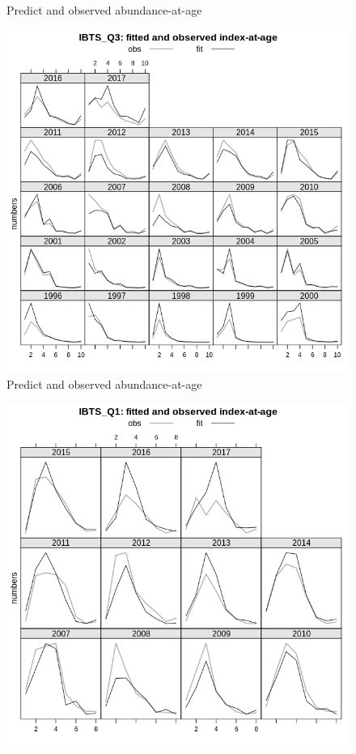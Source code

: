 \documentclass[a4paper,english,10pt]{article}\usepackage[]{graphicx}\usepackage[]{color}
\newenvironment{knitrout}{}{} %
\begin{document}
\begin{knitrout}
\begin{figure}[H]
{}

\caption[Predict and observed abundance-at-age]{Predict and observed abundance-at-age}\label{fig:idxplt4}
\end{figure}

\begin{figure}[H]

{\centering \includegraphics[width=.9\linewidth]{figure/idxplt-5} 

}

\caption[Predict and observed abundance-at-age]{Predict and observed abundance-at-age}\label{fig:idxplt5}
\end{figure}

\begin{figure}[H]

{\centering \includegraphics[width=.9\linewidth]{figure/idxplt-6} 

}
\end{figure}
\end{knitrout}
\end{document}
